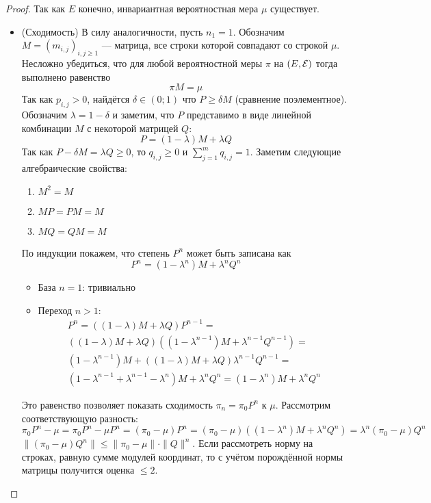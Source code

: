 \begin{proof}
	Так как $E$ конечно, инвариантная вероятностная мера $\mu$ существует.
	\begin{itemize}
		\item (Сходимость) В силу аналогичности, пусть $n_1 = 1$. Обозначим $M = (m_{i, j})_{i, j \ge 1}$ --- матрица, все строки которой совпадают со строкой $\mu$. Несложно убедиться, что для любой вероятностной меры $\pi$ на $(E, \mathcal{E})$ тогда выполнено равенство
		\[
			\pi M = \mu
		\]
		Так как $p_{i, j} > 0$, найдётся $\delta \in (0; 1)$ что $P \ge \delta M$ (сравнение поэлементное). Обозначим $\lambda = 1 - \delta$ и заметим, что $P$ представимо в виде линейной комбинации $M$ с некоторой матрицей $Q$:
		\[
			P = (1 - \lambda) M + \lambda Q
		\]
		Так как $P - \delta M = \lambda Q \ge 0$, то $q_{i, j} \ge 0$ и $\sum_{j = 1}^m q_{i, j} = 1$. Заметим следующие алгебраические свойства:
		\begin{enumerate}
			\item $M^2 = M$
			
			\item $MP = PM = M$
			
			\item $MQ = QM = M$
		\end{enumerate}
		По индукции покажем, что степень $P^n$ может быть записана как
		\[
			P^n = (1 - \lambda^n)M + \lambda^nQ^n
		\]
		\begin{itemize}
			\item База $n = 1$: тривиально
			
			\item Переход $n > 1$:
			\begin{multline*}
				P^n = ((1 - \lambda) M + \lambda Q)P^{n - 1} =
				\\
				((1 - \lambda)M + \lambda Q)((1 - \lambda^{n - 1})M + \lambda^{n - 1}Q^{n - 1}) =
				\\
				(1 - \lambda^{n - 1})M + ((1 - \lambda)M + \lambda Q)\lambda^{n - 1}Q^{n - 1} =
				\\
				(1 - \lambda^{n - 1} + \lambda^{n - 1} - \lambda^n)M + \lambda^nQ^n = (1 - \lambda^n)M + \lambda^nQ^n
			\end{multline*}
		\end{itemize}
		Это равенство позволяет показать сходимость $\pi_n = \pi_0 P^n$ к $\mu$. Рассмотрим соответствующую разность:
		\[
			\pi_0 P^n - \mu = \pi_0 P^n - \mu P^n = (\pi_0 - \mu)P^n = (\pi_0 - \mu)((1 - \lambda^n)M + \lambda^nQ^n) = \lambda^n(\pi_0 - \mu)Q^n
		\]
		$\|(\pi_0 - \mu)Q^n\| \le \|\pi_0 - \mu\| \cdot \|Q\|^n$. Если рассмотреть норму на строках, равную сумме модулей координат, то с учётом порождённой нормы матрицы получится оценка $\le 2$.
		

\end{itemize}
\end{proof}

